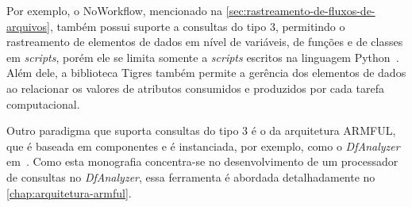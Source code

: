 Por exemplo, o NoWorkflow, mencionado na \autoref{sec:rastreamento-de-fluxos-de-arquivos}, também possui suporte a consultas do tipo 3, permitindo o rastreamento de elementos de dados em nível de variáveis, de funções e de classes em \textit{scripts}, porém ele se limita somente a \textit{scripts} escritos na linguagem Python~\cite{murta2014noworkflow}. Além dele, a biblioteca Tigres também permite a gerência dos elementos de dados ao relacionar os valores de atributos consumidos e produzidos por cada tarefa computacional.

Outro paradigma que suporta consultas do tipo 3 é o da arquitetura ARMFUL, que é baseada em componentes e é instanciada, por exemplo, como o \textit{DfAnalyzer} em~\cite{silva2017raw}. Como esta monografia concentra-se no desenvolvimento de um processador de consultas no \textit{DfAnalyzer}, essa ferramenta é abordada detalhadamente no \autoref{chap:arquitetura-armful}.